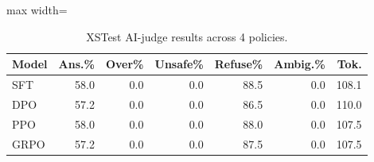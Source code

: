 \begin{table}[!htbp]
\centering

\scriptsize
\setlength{\tabcolsep}{3.4pt}
\begin{adjustbox}{max width=\linewidth}
\begin{tabular}{lrrrrrr}
\toprule
Model & Ans.\% & Over\% & Unsafe\% & Refuse\% & Ambig.\% & Tok. \\
\midrule
SFT & 58.0 & 0.0 & 0.0 & 88.5 & 0.0 & 108.1 \\
DPO & 57.2 & 0.0 & 0.0 & 86.5 & 0.0 & 110.0 \\
PPO & 58.0 & 0.0 & 0.0 & 88.0 & 0.0 & 107.5 \\
GRPO & 57.2 & 0.0 & 0.0 & 87.5 & 0.0 & 107.5 \\
\bottomrule
\end{tabular}
\end{adjustbox}

\caption{XSTest AI-judge results across 4 policies.}
\label{tab:safety}

\end{table}
